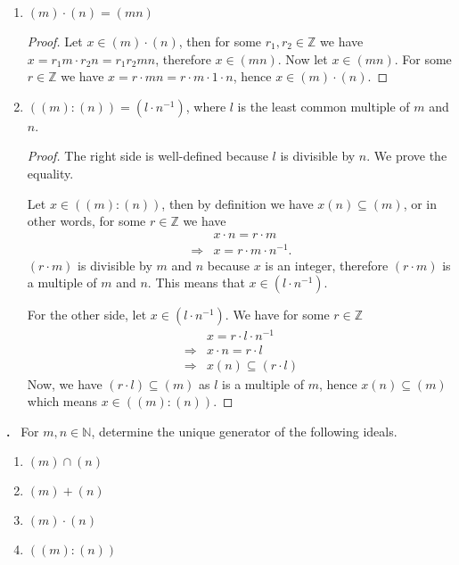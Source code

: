 \documentclass[11pt]{scrartcl}
\newcounter{problem}
\newcounter{solution}
\newcommand\Problem{%
  \stepcounter{problem}%
  \textbf{\theproblem.}~%
  \setcounter{solution}{0}%
}
\begin{document}
\begin{enumerate}
\begin{proof}
        For the other inclusion, let \(x \in (d)\), then we have \(x = a \cdot d\) for some \(a \in \mathbb{Z}\). Moreover by B\'ezout's identity, we have \(d = r_1 \cdot m + r_2 \cdot n\) for some \( r_1, r_2 \in \mathbb{Z} \). Putting these together, we have
        \begin{align*}
            x &= a \cdot d \\
            & = a \cdot (r_1 \cdot m + r_2 \cdot n) \\
            & = a r_1 m + a r_2 n \text{.}
        \end{align*}
        Hence, \(x \in (m) + (n)\).
    \end{proof}
    \item \( (m) \cdot (n) = (mn) \)
    \begin{proof}
        Let \(x \in (m) \cdot (n)\), then for some \(r_1, r_2 \in \mathbb{Z}\) we have \(x = r_1 m \cdot r_2 n = r_1 r_2 m n\), therefore \(x \in (mn)\).
        Now let \(x \in (mn)\). For some \(r \in \mathbb{Z}\) we have \(x = r \cdot mn = r \cdot m \cdot 1 \cdot n\), hence \(x \in (m) \cdot (n)\).
    \end{proof}
    \item \(( (m) : (n) ) = (l \cdot n^{-1})\), where \(l\) is the least common multiple of \(m\) and \(n\).
    \begin{proof}
        The right side is well-defined because \(l\) is divisible by \(n\). We prove the equality.

        Let \(x \in ( (m) : (n) )\), then by definition we have \( x (n) \subseteq (m) \), or in other words, for some  \(r \in \mathbb{Z}\) we have
        \begin{align*}
            &x \cdot n = r \cdot m \\
            \Rightarrow &x = r \cdot m \cdot n^{-1} \text{.}
        \end{align*}
        \((r \cdot m)\) is divisible by \(m\) and \(n\) because \(x\) is an integer, therefore \((r \cdot m)\) is a multiple of \(m\) and \(n\). This means that \(x \in (l \cdot n^{-1})\).

        For the other side, let \(x \in (l \cdot n^{-1})\). We have for some \(r \in \mathbb{Z}\)
        \begin{align*}
            & x = r \cdot l \cdot n^{-1} \\
            \Rightarrow& x \cdot n = r \cdot l \\
            \Rightarrow& x (n) \subseteq (r \cdot l) 
        \end{align*}
        Now, we have \((r \cdot l) \subseteq (m)\) as \(l\) is a multiple of \(m\), hence \(x(n) \subseteq (m)\) which means \(x \in ( (m) : (n) )\).
    \end{proof}
\end{enumerate}

\newpage

\Problem For \(m, n \in \mathbb{N}\), determine the unique generator of the following ideals.
\begin{enumerate}
    \item \( (m) \cap (n) \)
    \item \( (m) + (n) \)
    \item \( (m) \cdot (n)\)
    \item \( ((m) : (n)) \)
\end{enumerate}
\end{document}

